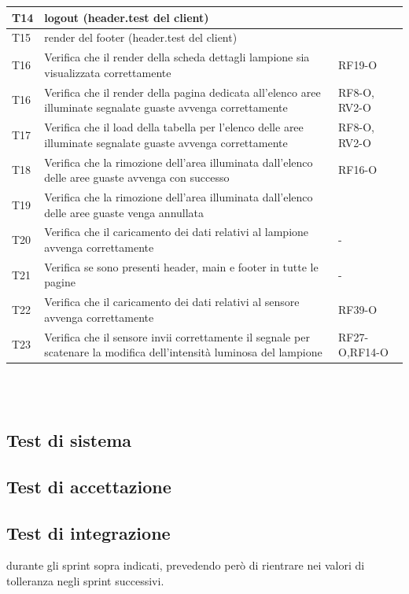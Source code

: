 \documentclass[a4paper, 12pt]{article}
\begin{document}
\begin{center}
\begin{tabularx}{\textwidth}{|X|X|X|}
		T14 & logout (header.test del client) & \\
		\hline
		T15 & render del footer (header.test del client) & \\
		\hline
		T16 & Verifica che il render della scheda dettagli lampione sia visualizzata correttamente & RF19-O \\
		\hline
		T16 & Verifica che il render della pagina dedicata all'elenco aree illuminate segnalate guaste avvenga correttamente & RF8-O, RV2-O \\
		\hline
		T17 & Verifica che il load della tabella per l'elenco delle aree illuminate segnalate guaste avvenga correttamente & RF8-O, RV2-O \\
		\hline
		T18 & Verifica che la rimozione dell'area illuminata dall'elenco delle aree guaste avvenga con successo & RF16-O \\
		\hline
		T19 & Verifica che la rimozione dell'area illuminata dall'elenco delle aree guaste venga annullata \\
		\hline
		T20 & Verifica che il caricamento dei dati relativi al lampione avvenga correttamente & - \\
		\hline 
		T21 & Verifica se sono presenti header, main e footer in tutte le pagine & - \\
		\hline
		T22 & Verifica che il caricamento dei dati relativi al sensore avvenga correttamente & RF39-O \\
		\hline
		T23 &  Verifica che il sensore invii correttamente il segnale per scatenare la modifica dell'intensità luminosa del lampione & RF27-O,RF14-O\\ 
	\end{tabularx}\\[8pt]
	\mbox{}\\
\end{center}


\subsection*{Test di sistema}
\subsection*{Test di accettazione}
\subsection*{Test di integrazione}

durante gli sprint sopra indicati, prevedendo però di rientrare nei valori di tolleranza negli sprint successivi.
\end{document}
